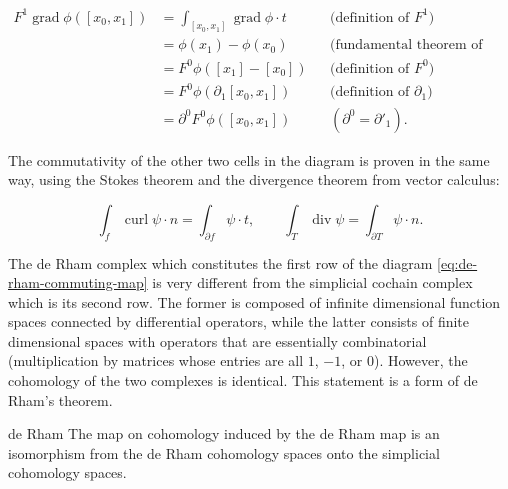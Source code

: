 \[
\begin{aligned}
F^1\operatorname{grad}\phi([x_0,x_1])
&=\int_{[x_0,x_1]}\operatorname{grad}\phi\cdot t
&&\text{{(definition of $F^1$)}}\\
&=\phi(x_1)-\phi(x_0)
&&\text{{(fundamental theorem of calculus)}}\\
&=F^0\phi([x_1]-[x_0])
&&\text{{(definition of $F^0$)}}\\
&=F^0\phi(\partial_1[x_0,x_1])
&&\text{{(definition of $\partial_1$)}}\\
&=\partial^0F^0\phi([x_0,x_1])
&&(\partial^0=\partial'_1).
\end{aligned}
\]

{The commutativity of the other two cells in the diagram is proven in the same way, using the Stokes theorem and the divergence theorem from vector calculus:}

\[
\int_f\operatorname{curl}\psi\cdot n=\int_{\partial f}\psi\cdot t,\qquad
\int_T\operatorname{div}\psi=\int_{\partial T}\psi\cdot n.
\]

{The de Rham complex which constitutes the first row of the diagram \eqref{eq:de-rham-commuting-map} is very different from the simplicial cochain complex which is its second row. The former is composed of infinite dimensional function spaces connected by differential operators, while the latter consists of finite dimensional spaces with operators that are essentially combinatorial (multiplication by matrices whose entries are all $1$, $-1$, or $0$). However, the cohomology of the two complexes is identical. This statement is a form of de Rham's theorem.}

\begin{Theorem}{de Rham}\label{thm:de-rham-isomorphism}
{The map on cohomology induced by the de Rham map is an isomorphism from the de Rham cohomology spaces onto the simplicial cohomology spaces.}
\end{Theorem}


